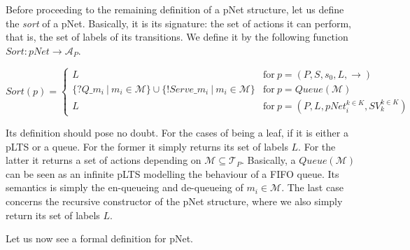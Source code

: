 		
	Before proceeding to the remaining 
	definition of a pNet structure, let us define the \textit{sort} of a pNet.
	Basically, it is its signature: the set of actions it can perform, 
	that is, the set of labels of its transitions. We define it by the following
	function $Sort : pNet \rightarrow \mathcal{A}_P$.

	\begin{center}
	\begin{changemargin}{0cm}{-2cm}		
		$Sort(p) = \left\{ \begin{array}{ll}
           L & \mbox{for} \ p =(P, S, s_0, L, \rightarrow)       \\ 
           \{ ?Q\_m_i \ | \ m_i \in \mathcal{M}\} \cup \{ !Serve\_m_i \ | \ m_i \in \mathcal{M}\} & \mbox{for} \ p = Queue(\mathcal{M})\\
           L                           & \mbox{for} \ p = (P, L, pNet_i^{k \in K}, SV_k^{k \in K})
        \end{array}\right.$      
	\end{changemargin}	 
	\end{center}
	
	
	\noindent  Its definition should pose no doubt. For the cases of being a leaf, 
	if it is either a pLTS or a queue. For the former it simply returns 
	its set of labels $L$. For the latter it returns a set of actions 
	depending on $\mathcal{M} \subseteq \mathcal{T}_P$. Basically, a $Queue(\mathcal{M})$ 
	can be seen as an infinite pLTS modelling the behaviour of a \ac{FIFO} queue. 
	Its semantics is simply the en-queueing and de-queueing of
	$m_i \in \mathcal{M}$. The last case concerns the recursive constructor of
	the pNet structure, where we also simply return its set of labels $L$.
	
			Let us now see a formal definition for pNet.	

